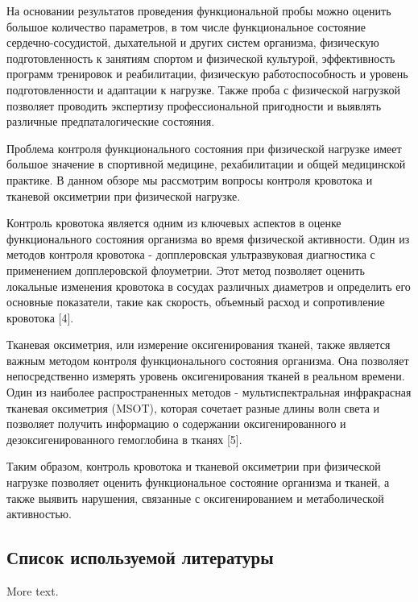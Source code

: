 \documentclass[11pt]{article} %
\begin{document}
На основании результатов проведения функциональной пробы можно оценить большое количество параметров, в том числе функциональное состояние сердечно-сосудистой, дыхательной и других систем организма, физическую подготовленность к занятиям спортом и физической культурой, эффективность программ тренировок и реабилитации, физическую работоспособность и уровень подготовленности и адаптации к нагрузке. Также проба с физической нагрузкой позволяет проводить экспертизу профессиональной пригодности и выявлять различные предпаталогические состояния.

Проблема контроля функционального состояния при физической нагрузке имеет большое значение в спортивной медицине, рехабилитации и общей медицинской практике. В данном обзоре мы рассмотрим вопросы контроля кровотока и тканевой оксиметрии при физической нагрузке.

Контроль кровотока является одним из ключевых аспектов в оценке функционального состояния организма во время физической активности. Один из методов контроля кровотока - допплеровская ультразвуковая диагностика с применением допплеровской флоуметрии. Этот метод позволяет оценить локальные изменения кровотока в сосудах различных диаметров и определить его основные показатели, такие как скорость, объемный расход и сопротивление кровотока [4].


Тканевая оксиметрия, или измерение оксигенирования тканей, также является важным методом контроля функционального состояния организма. Она позволяет непосредственно измерять уровень оксигенирования тканей в реальном времени. Один из наиболее распространенных методов - мультиспектральная инфракрасная тканевая оксиметрия (MSOT), которая сочетает разные длины волн света и позволяет получить информацию о содержании оксигенированного и дезоксигенированного гемоглобина в тканях [5].



Таким образом, контроль кровотока и тканевой оксиметрии при физической нагрузке позволяет оценить функциональное состояние организма и тканей, а также выявить нарушения, связанные с оксигенированием и метаболической активностью.

\subsection{Список используемой литературы}

More text.
\end{document}
